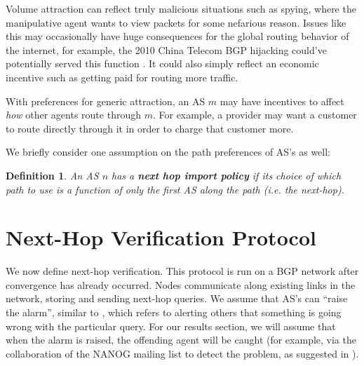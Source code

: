 \documentclass[10pt]{article}
\newtheorem{definition}{Definition}
\begin{document}
    Volume attraction can reflect truly malicious situations such as spying,
    where the manipulative agent wants to view packets for some nefarious
    reason. Issues like this may occasionally have huge consequences for the
    global routing behavior of the internet, for example, the 2010
    China Telecom BGP hijacking could've potentially served this function
    \cite{ChinaHijack}. It could also simply reflect an economic incentive such as
    getting paid for routing more traffic.

    With preferences for generic attraction, an AS $m$ may have incentives to affect
    \emph{how} other agents route through $m$.
    For example, a provider may want a customer to route directly through it
    in order to charge that customer more.

    We briefly consider one assumption on the path preferences of AS's as well:
    \begin{definition}
      An AS $n$ has a \textbf{next hop import policy} if its choice of which path to use
      is a function of only the first AS along the path (i.e. the next-hop).
    \end{definition}

\section{Next-Hop Verification Protocol}
  We now define next-hop verification.
  This protocol is run on a BGP network after convergence has already occurred.
  Nodes communicate along existing links in the network, storing and sending
  next-hop queries. We assume that AS's can ``raise the alarm'', similar to
  \cite{Attraction}, which refers to alerting others that something
  is going wrong with the particular query. For our results section,
  we will assume that when the alarm is raised, the offending agent will be
  caught (for example, via the collaboration of the NANOG mailing list to detect
  the problem, as suggested in \cite{Attraction}).
\end{document}

